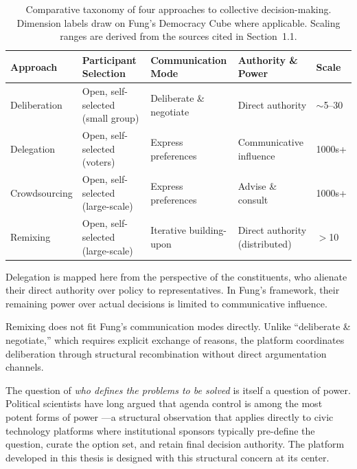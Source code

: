 \documentclass[a4paper, 12pt, twoside]{iviathesis}
\begin{document}
\begin{table}[ht]
\centering
\begin{threeparttable}
\caption{Comparative taxonomy of four approaches to collective decision-making. Dimension labels draw on Fung's \cite{fung2006} Democracy Cube where applicable. Scaling ranges are derived from the sources cited in Section~1.1.}
\label{tab:approaches-compared}
\small
\begin{tabularx}{\textwidth}{l X X X l}
\toprule
\textbf{Approach} & \textbf{Participant Selection} & \textbf{Communication Mode} & \textbf{Authority \& Power} & \textbf{Scale} \\
\midrule
Deliberation & Open, self-selected (small group) & Deliberate \& negotiate & Direct authority & $\sim$5--30 \\[4pt]
Delegation & Open, self-selected (voters) & Express preferences & Communicative influence\tnote{a} & 1000s+ \\[4pt]
Crowdsourcing & Open, self-selected (large-scale) & Express preferences & Advise \& consult & 1000s+ \\[4pt]
Remixing & Open, self-selected (large-scale) & Iterative building-upon\tnote{b} & Direct authority (distributed) & $>$10 \\
\bottomrule
\end{tabularx}
\begin{tablenotes}\footnotesize
  \item[a] Delegation is mapped here from the perspective of the constituents, who alienate their direct authority over policy to representatives. In Fung's framework, their remaining power over actual decisions is limited to communicative influence.
  \item[b] Remixing does not fit Fung's communication modes directly. Unlike ``deliberate \& negotiate,'' which requires explicit exchange of reasons, the platform coordinates deliberation through structural recombination without direct argumentation channels.
\end{tablenotes}
\end{threeparttable}
\end{table}

The question of \textit{who defines the problems to be solved} is itself a question of power. Political scientists have long argued that agenda control is among the most potent forms of power \cite{schattschneider1960, bachrach1962}---a structural observation that applies directly to civic technology platforms where institutional sponsors typically pre-define the question, curate the option set, and retain final decision authority. The platform developed in this thesis is designed with this structural concern at its center.
\end{document}
